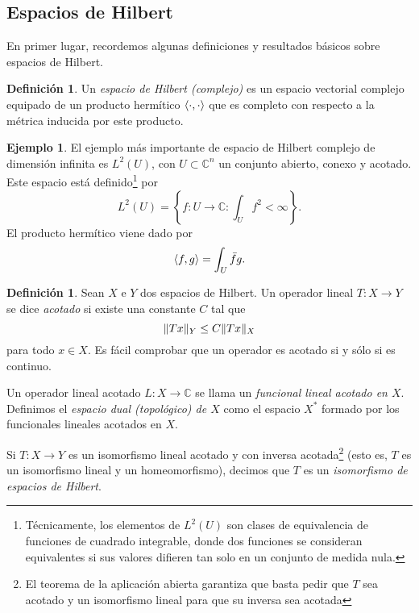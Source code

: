 \documentclass[12pt,a4paper]{article}
\theoremstyle{definition} \newtheorem{defn}[thm]{Definición}
\theoremstyle{definition} \newtheorem{ejemplo}[thm]{Ejemplo}
\theoremstyle{definition} \newtheorem{ejercicio}[thm]{Ejercicio}
\theoremstyle{remark} \newtheorem*{obs}{Observación}
\DeclarePairedDelimiter\norm{\lVert}{\rVert}
\DeclarePairedDelimiter\esc{\langle}{\rangle}
\newcommand{\CC}{\mathbb{C}}
\begin{document}
 \subsection{Espacios de Hilbert}
 En primer lugar, recordemos algunas definiciones y resultados básicos sobre espacios de Hilbert.
 \begin{defn}
   Un \emph{espacio de Hilbert (complejo)}  es un espacio vectorial complejo equipado de un producto hermítico $\esc{\cdot,\cdot}$ que es completo con respecto a la métrica inducida por este producto.
 \end{defn}
 \begin{ejemplo}
   El ejemplo más importante de espacio de Hilbert complejo de dimensión infinita es $L^2(U)$, con $U\subset \CC^n$ un conjunto abierto, conexo y acotado. Este espacio está definido\footnote{Técnicamente, los elementos de $L^2(U)$ son clases de equivalencia de funciones de cuadrado integrable, donde dos funciones se consideran equivalentes si sus valores difieren tan solo en un conjunto de medida nula.} por
   \begin{equation*}
     L^2(U)= \left\{ f:U \rightarrow \CC : \int_U f^2 < \infty \right\}.
   \end{equation*}
   El producto hermítico viene dado por
   \begin{equation*}
     \esc{f,g}=\int_U \bar{f} g.
   \end{equation*}
 \end{ejemplo}
 \begin{defn}
   Sean $X$ e $Y$ dos espacios de Hilbert. Un operador lineal $T:X\rightarrow Y$ se dice \emph{acotado} si existe una constante $C$ tal que
   \begin{equation*}
     \norm{Tx}_Y \leq C \norm{Tx}_X
   \end{equation*}
   para todo $x\in X$. Es fácil comprobar que un operador es acotado si y sólo si es continuo.

   Un operador lineal acotado $L:X\rightarrow \CC$ se llama un \emph{funcional lineal acotado en $X$}. Definimos el \emph{espacio dual (topológico) de $X$} como el espacio $X^*$ formado por los funcionales lineales acotados en $X$. 

   Si $T:X\rightarrow Y$ es un isomorfismo lineal acotado y con inversa acotada\footnote{El teorema de la aplicación abierta garantiza que basta pedir que $T$ sea acotado y un isomorfismo lineal para que su inversa sea acotada} (esto es, $T$ es un isomorfismo lineal y un homeomorfismo), decimos que $T$ es un \emph{isomorfismo de espacios de Hilbert}.
 \end{defn}
\end{document}
